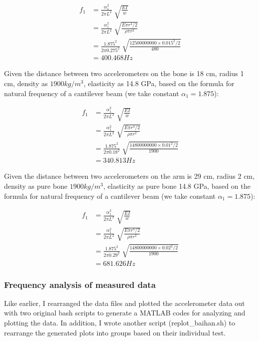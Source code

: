 \documentclass{sigchi}
\begin{document}
\begin{align} \label{eq:beam}
f_1&=\frac{\alpha_1^2}{2\pi L^2}\sqrt[]{\frac{EI}{w}} \\
&=\frac{\alpha_1^2}{2\pi L^2}\sqrt[]{\frac{E\pi r^4 / 2}{\rho \pi r^2}} \\
&=\frac{1.875^2}{2\pi 0.275^2}\sqrt[]{\frac{12500000000 \times 0.015^2/2}{480}} \\
&=400.468 Hz
\end{align}

Given the distance between two accelerometers on the bone is 18 cm, radius 1 cm, density as $1900 kg/m^3$, elasticity as 14.8 GPa, based on the formula for natural frequency of a cantilever beam (we take constant $\alpha_1 = 1.875$):

\begin{align} \label{eq:beam}
f_1&=\frac{\alpha_1^2}{2\pi L^2}\sqrt[]{\frac{EI}{w}} \\
&=\frac{\alpha_1^2}{2\pi L^2}\sqrt[]{\frac{E\pi r^4 / 2}{\rho \pi r^2}} \\
&=\frac{1.875^2}{2\pi 0.18^2}\sqrt[]{\frac{14800000000 \times 0.01^2/2}{1900}} \\
&=340.813 Hz
\end{align}

Given the distance between two accelerometers on the arm is 29 cm, radius 2 cm, density as pure bone $1900 kg/m^3$, elasticity as pure bone 14.8 GPa, based on the formula for natural frequency of a cantilever beam (we take constant $\alpha_1 = 1.875$): 

\begin{align} \label{eq:beam}
f_1&=\frac{\alpha_1^2}{2\pi L^2}\sqrt[]{\frac{EI}{w}} \\
&=\frac{\alpha_1^2}{2\pi L^2}\sqrt[]{\frac{E\pi r^4 / 2}{\rho \pi r^2}} \\
&=\frac{1.875^2}{2\pi 0.29^2}\sqrt[]{\frac{14800000000 \times 0.02^2/2}{1900}} \\
&=681.626 Hz
\end{align}

\subsubsection{Frequency analysis of measured data} 

Like earlier, I rearranged the data files and plotted the accelerometer data out with two original bash scripts to generate a MATLAB codes for analyzing and plotting the data. In addition, I wrote another script (replot\_baihan.sh) to rearrange the generated plots into groups based on their individual test.
\end{document}
